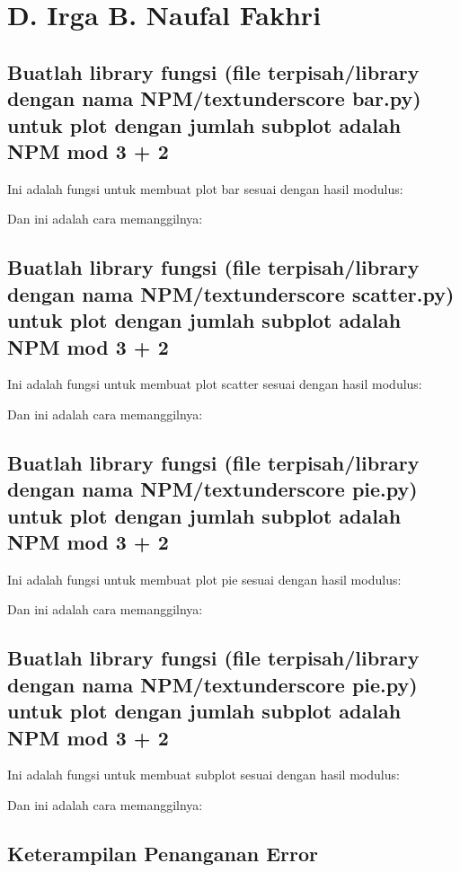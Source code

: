 \section{D. Irga B. Naufal Fakhri}
\subsection{Buatlah library fungsi (file terpisah/library dengan nama NPM/textunderscore bar.py) untuk plot dengan jumlah subplot adalah NPM mod 3 + 2}

Ini adalah fungsi untuk membuat plot bar sesuai dengan hasil modulus:


Dan ini adalah cara memanggilnya:


\subsection{Buatlah library fungsi (file terpisah/library dengan nama NPM/textunderscore scatter.py) untuk plot dengan jumlah subplot adalah NPM mod 3 + 2}

Ini adalah fungsi untuk membuat plot scatter sesuai dengan hasil modulus:


Dan ini adalah cara memanggilnya:


\subsection{Buatlah library fungsi (file terpisah/library dengan nama NPM/textunderscore pie.py) untuk plot dengan jumlah subplot adalah NPM mod 3 + 2}

Ini adalah fungsi untuk membuat plot pie sesuai dengan hasil modulus:


Dan ini adalah cara memanggilnya:


\subsection{Buatlah library fungsi (file terpisah/library dengan nama NPM/textunderscore pie.py) untuk plot dengan jumlah subplot adalah NPM mod 3 + 2}

Ini adalah fungsi untuk membuat subplot sesuai dengan hasil modulus:


Dan ini adalah cara memanggilnya:



\subsection{Keterampilan Penanganan Error}

